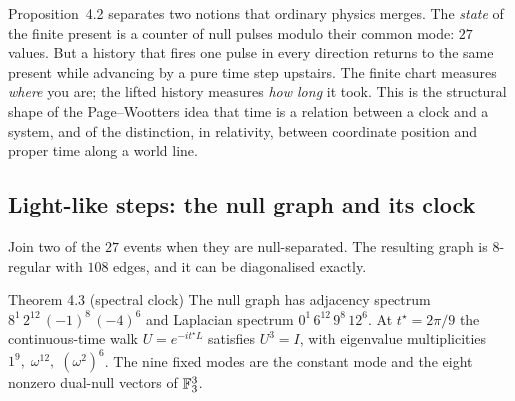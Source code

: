 \begin{physical}
Proposition~4.2 separates two notions that ordinary physics merges. The \emph{state} of
the finite present is a counter of null pulses modulo their common mode: $27$ values. But
a history that fires one pulse in every direction returns to the same present while
advancing by a pure time step upstairs. The finite chart measures \emph{where} you are;
the lifted history measures \emph{how long} it took. This is the structural shape of the
Page--Wootters idea that time is a relation between a clock and a system, and of the
distinction, in relativity, between coordinate position and proper time along a world
line. \tierB
\end{physical}

\subsection{Light-like steps: the null graph and its clock}

Join two of the $27$ events when they are null-separated. The resulting graph is
$8$-regular with $108$ edges, and it can be diagonalised exactly.

\begin{result}{Theorem 4.3 (spectral clock) \hfill \tierC}
The null graph has adjacency spectrum $8^{1}\,2^{12}\,(-1)^{8}\,(-4)^{6}$ and Laplacian
spectrum $0^{1}\,6^{12}\,9^{8}\,12^{6}$. At $t^\star=2\pi/9$ the continuous-time walk
$U=e^{-it^\star L}$ satisfies $U^3=I$, with eigenvalue multiplicities
$1^{9},\;\omega^{12},\;(\omega^2)^{6}$. The nine fixed modes are the constant mode and
the eight nonzero dual-null vectors of $\mathbb{F}_3^3$.
\end{result}

